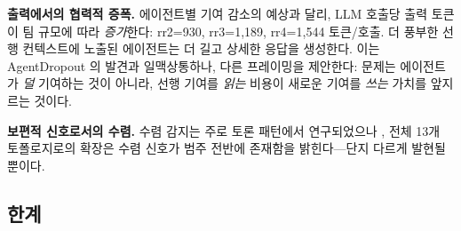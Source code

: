 \textbf{출력에서의 협력적 증폭.} 에이전트별 기여 감소의 예상과 달리, LLM 호출당 출력 토큰이 팀 규모에 따라 \emph{증가}한다: rr2=930, rr3=1,189, rr4=1,544 토큰/호출. 더 풍부한 선행 컨텍스트에 노출된 에이전트는 더 길고 상세한 응답을 생성한다. 이는 AgentDropout \citep{wang2025agentdropout}의 발견과 일맥상통하나, 다른 프레이밍을 제안한다: 문제는 에이전트가 \emph{덜} 기여하는 것이 아니라, 선행 기여를 \emph{읽는} 비용이 새로운 기여를 \emph{쓰는} 가치를 앞지르는 것이다.

\textbf{보편적 신호로서의 수렴.} 수렴 감지는 주로 토론 패턴에서 연구되었으나 \citep{hu2025when}, 전체 13개 토폴로지로의 확장은 수렴 신호가 범주 전반에 존재함을 밝힌다---단지 다르게 발현될 뿐이다.

\subsection{한계}

